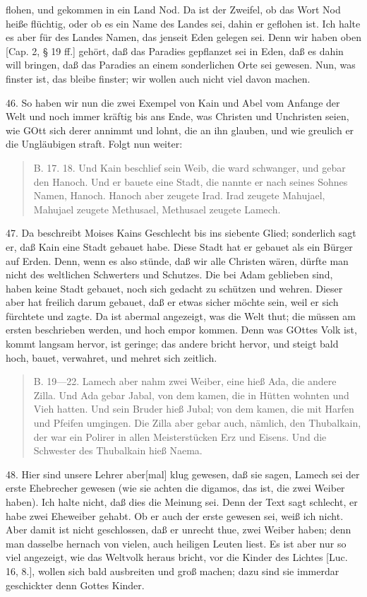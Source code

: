 flohen, und gekommen in ein Land Nod. Da ist der Zweifel, ob das Wort Nod heiße flüchtig, oder ob es ein Name des Landes sei, dahin er geflohen ist. Ich halte es aber für des Landes Namen, das jenseit Eden gelegen sei. Denn wir haben oben [Cap. 2, § 19 ff.] gehört, daß das Paradies gepflanzet sei in Eden, daß es dahin will bringen, daß das Paradies an einem sonderlichen Orte sei gewesen. Nun, was finster ist, das bleibe finster; wir wollen auch nicht viel davon machen.

46. So haben wir nun die zwei Exempel von Kain und Abel vom Anfange der Welt und noch immer kräftig bis ans Ende, was Christen und Unchristen seien, wie GOtt sich derer annimmt und lohnt, die an ihn glauben, und wie greulich er die Ungläubigen straft. Folgt nun weiter:

\begin{quote}
B. 17. 18. Und Kain beschlief sein Weib, die ward schwanger, und gebar den Hanoch. Und er bauete eine Stadt, die nannte er nach seines Sohnes Namen, Hanoch. Hanoch aber zeugete Irad. Irad zeugete Mahujael, Mahujael zeugete Methusael, Methusael zeugete Lamech.
\end{quote}

47. Da beschreibt Moises Kains Geschlecht bis ins siebente Glied; sonderlich sagt er, daß Kain eine Stadt gebauet habe. Diese Stadt hat er gebauet als ein Bürger auf Erden. Denn, wenn es also stünde, daß wir alle Christen wären, dürfte man nicht des weltlichen Schwerters und Schutzes. Die bei Adam geblieben sind, haben keine Stadt gebauet, noch sich gedacht zu schützen und wehren. Dieser aber hat freilich darum gebauet, daß er etwas sicher möchte sein, weil er sich fürchtete und zagte. Da ist abermal angezeigt, was die Welt thut; die müssen am ersten beschrieben werden, und hoch empor kommen. Denn was GOttes Volk ist, kommt langsam hervor, ist geringe; das andere bricht hervor, und steigt bald hoch, bauet, verwahret, und mehret sich zeitlich.

\begin{quote}
B. 19—22. Lamech aber nahm zwei Weiber, eine hieß Ada, die andere Zilla. Und Ada gebar Jabal, von dem kamen, die in Hütten wohnten und Vieh hatten. Und sein Bruder hieß Jubal; von dem kamen, die mit Harfen und Pfeifen umgingen. Die Zilla aber gebar auch, nämlich, den Thubalkain, der war ein Polirer in allen Meisterstücken Erz und Eisens. Und die Schwester des Thubalkain hieß Naema.
\end{quote}

48. Hier sind unsere Lehrer aber[mal] klug gewesen, daß sie sagen, Lamech sei der erste Ehebrecher gewesen (wie sie achten die digamos, das ist, die zwei Weiber haben). Ich halte nicht, daß dies die Meinung sei. Denn der Text sagt schlecht, er habe zwei Eheweiber gehabt. Ob er auch der erste gewesen sei, weiß ich nicht. Aber damit ist nicht geschlossen, daß er unrecht thue, zwei Weiber haben; denn man dasselbe hernach von vielen, auch heiligen Leuten liest. Es ist aber nur so viel angezeigt, wie das Weltvolk heraus bricht, vor die Kinder des Lichtes [Luc. 16, 8.], wollen sich bald ausbreiten und groß machen; dazu sind sie immerdar geschickter denn Gottes Kinder.

